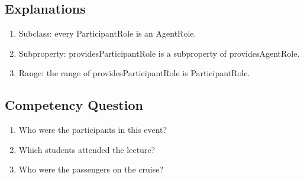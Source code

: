 \subsection{Explanations}
\label{exp:ParticipantRole}
\begin{enumerate}
\item Subclass: every \textsf{ParticipantRole} is an \textsf{AgentRole}.
\item Subproperty: \textsf{providesParticipantRole} is a subproperty of \textsf{providesAgentRole}.
\item Range: the range of \textsf{providesParticipantRole} is \textsf{ParticipantRole}.
\end{enumerate}

\subsection{Competency Question}
\label{cqs:ParticipantRole}
\begin{enumerate}[CQ1.]
\item Who were the participants in this event?
\item Which students attended the lecture?
\item Who were the passengers on the cruise?
\end{enumerate}

\newpage
